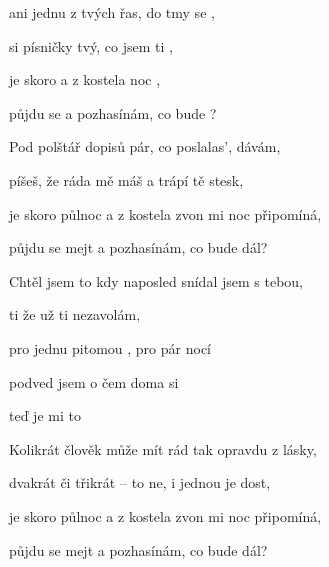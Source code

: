 

\zs
{}ani jednu z tvých řas, do tmy se ,

 si písničky tvý, co jsem ti ,

je skoro  a z kostela  noc ,

půjdu se  a pozhasínám, co bude ?
\ks

\zs
Pod polštář dopisů pár, co poslalas', dávám,

píšeš, že ráda mě máš a trápí tě stesk,

je skoro půlnoc a z kostela zvon mi noc připomíná,

půjdu se mejt a pozhasínám, co bude dál?
\ks

\zr
Chtěl jsem to  kdy naposled snídal jsem s tebou,

ti  že už ti nezavolám,

pro jednu pitomou , pro pár nocí 

podved jsem  o čem doma si 

teď je mi to 
\kr

\zs
Kolikrát člověk může mít rád tak opravdu z lásky,

dvakrát či třikrát -- to ne, i jednou je dost,

je skoro půlnoc a z kostela zvon mi noc připomíná,

půjdu se mejt a pozhasínám, co bude dál?
\ks


\zr \kr

\kp






